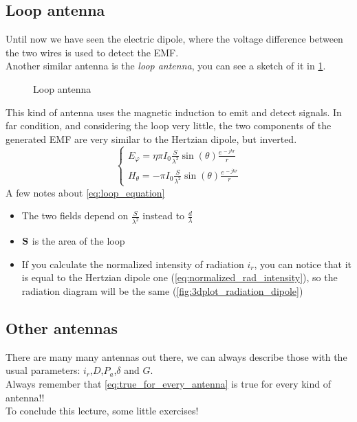 \subsection*{Loop antenna}
Until now we have seen the electric dipole, where the voltage difference between the two wires is used to detect the EMF.\\
Another similar antenna is the \emph{loop antenna}, you can see a sketch of it in \cref{fig:loop_antenna}.
\begin{figure}[H]
    \begin{center}
    \end{center} \caption{Loop antenna}\label{fig:loop_antenna} 
\end{figure}
This kind of antenna uses the magnetic induction to emit and detect signals. In far condition, and considering the loop very little, the two components of the generated EMF are very similar to the Hertzian dipole, but inverted.
\begin{equation}
    \begin{cases}
        E_\varphi=\eta \pi I_0\frac{S}{\lambda^2}\sin(\theta)\frac{e^{\,-jkr}}{r}\\[5pt]
        H_\theta=- \pi I_0\frac{S}{\lambda^2}\sin(\theta)\frac{e^{\,-jkr}}{r}
    \end{cases}\label{eq:loop_equation}
\end{equation}
A few notes about \cref{eq:loop_equation}
\begin{itemize}
    \item The two fields depend on $\frac{S}{\lambda^2}$ instead to $\frac{d}{\lambda}$
    \item $\bf{S}$ is the area of the loop
    \item If you calculate the normalized intensity of radiation $i_r$, you can notice that it is equal to the Hertzian dipole one (\cref{eq:normalized_rad_intensity}), so the radiation diagram will be the same (\cref{fig:3dplot_radiation_dipole})
\end{itemize}
\subsection*{Other antennas}
There are many many antennas out there, we can always describe those with the usual parameters: $i_r$,$D$,$P_a$,$\delta$ and $G$.\\
Always remember that \cref{eq:true_for_every_antenna} is true for every kind of antenna!!\\
To conclude this lecture, some little exercises!
